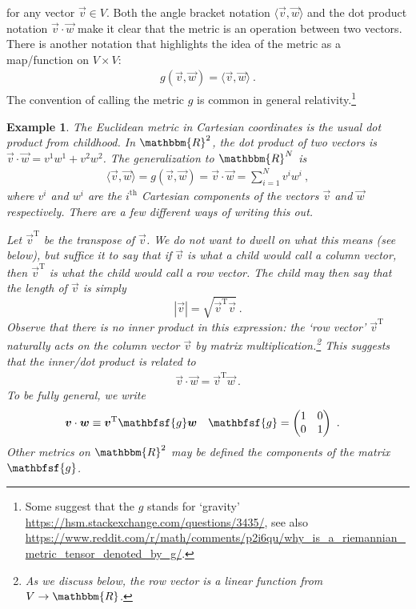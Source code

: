 \documentclass[
  11pt,
	colorful,
	raggedright,
]{tufte-style-thesis-flip}
\newtheorem{example}{Example}[section]
\newcommand{\tens}[1]{\mathbfsf{#1}}
\begin{document}
for any vector $\vec{v}\in V$. 
%
Both the angle bracket notation $\langle \vec v, \vec w \rangle$ and the dot product notation $\vec v \cdot \vec w$ make it clear that the metric is an operation between two vectors. There is another notation that highlights the idea of the metric as a map/function on $V\times V$:
\begin{align}
  g(\vec v, \vec w) = \langle \vec v, \vec w \rangle \ . 
\end{align}
The convention of calling the metric $g$ is common in general relativity.\footnote{Some suggest that the $g$ stands for `gravity' \url{https://hsm.stackexchange.com/questions/3435/}, see also \url{https://www.reddit.com/r/math/comments/p2i6qu/why_is_a_riemannian_metric_tensor_denoted_by_g/}.} 

\begin{example} The Euclidean metric in Cartesian coordinates is the usual dot product from childhood. In $\mathbbm{R}^2$, the dot product of two vectors is $\vec{v}\cdot \vec{w} = v^1w^1 + v^2w^2$. The generalization to $\mathbbm{R}^N$ is
\begin{align}
  \langle \vec v, \vec w \rangle = g(\vec v, \vec w) = \vec v\cdot \vec w
  = \sum_{i=1}^N v^i w^i \ ,
  \label{ex:euclidean:R2:metric}
\end{align}
where $v^i$ and $w^i$ are the $i^\text{th}$ Cartesian components of the vectors $\vec v$ and $\vec w$ respectively. There are a few different ways of writing this out. 

Let $\vec v^\text{T}$ be the transpose of $\vec{v}$. We do not want to dwell on what this means (see below), but suffice it to say that if $\vec{v}$ is what a child would call a column vector, then $\vec v^\text{T}$ is what the child would call a row vector. The child may then say that the length of $\vec{v}$ is simply $$|\vec v| = \sqrt{\vec v^\text{T} \vec v}\ .$$ Observe that there is no inner product in this expression: the `row vector' $\vec v^\text{T}$ naturally acts on the column vector $\vec v$ by matrix multiplication.\footnote{As we discuss below, the row vector is a linear function from $V\to \mathbbm{R}$.} This suggests that the inner/dot product is related to
\begin{align}
  \vec v\cdot \vec w = \vec v^\text{T} \vec w \ .
\end{align}
To be fully general, we write
\begin{align}
  \vec v \cdot \vec w &\equiv \vec v^\text{T} \tens{g} \vec{w}
  &
  \tens{g} &= 
  \begin{pmatrix}
    1 & 0 \\
    0 & 1
  \end{pmatrix} \ .
  \label{eq:eg:R2:dot:product:matrix}
\end{align}
Other metrics on $\mathbbm{R}^2$ may be defined the components of the matrix $\tens{g}$. 


\end{example}
\end{document}
